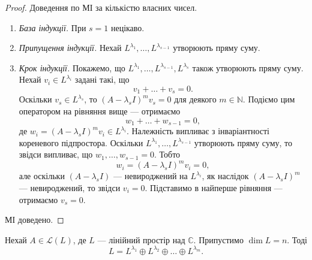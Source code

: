 \documentclass{math_library}
\begin{document}
\begin{proof}
Доведення по МІ за кількістю власних чисел.
\begin{enumerate}[nosep,wide=0pt,label={\Roman*.}]
\item \textit{База індукції.} При $s = 1$ нецікаво.

\item \textit{Припущення індукції.} Нехай $L^{\lambda_1},\dots ,L^{\lambda_{s-1}}$ утворюють пряму суму.

\item \textit{Крок індукції.} Покажемо, що $L^{\lambda_1},\dots, L^{\lambda_{s-1}},L^{\lambda_s}$ також утворюють пряму суму. Нехай $v_i \in L^{\lambda_i}$ задані такі, що 
\[
v_1+\dots+v_s = 0.
\]
Оскільки $v_s \in L^{\lambda_s}$, то $(A-\lambda_s I)^m v_s = 0$ для деякого $m \in \mathbb{N}$. Подіємо цим оператором на рівняння вище --- отримаємо
\[
w_1 + \dots + w_{s-1} = 0,
\]
де $w_i = (A-\lambda_s I)^m v_i \in L^{\lambda_i}$. Належність випливає з інваріантності кореневого підпростора. Оскільки $L^{\lambda_1},\dots,L^{\lambda_{s-1}}$ утворюють пряму суму, то звідси випливає, що $w_1,\dots,w_{s-1} = 0$. Тобто 
\[
w_i = (A-\lambda_s I)^m v_i = 0,
\]
але оскільки $(A-\lambda_s I)$ --- невироджений на $L^{\lambda_i}$, як наслідок  $(A-\lambda_s I)^m$ --- невироджений, то звідси $v_i = 0$. Підставимо в найперше рівняння --- отримаємо $v_s = 0$.
\end{enumerate}
МІ доведено.
\end{proof}

\begin{theorem}
\label{space_decomposition_into_generalized_eigenspace}
Нехай $A \in \mathcal{L}(L)$, де $L$ --- лінійний простір над $\mathbb{C}$. Припустимо $\dim L = n$. Тоді 
\[
L = L^{\lambda_1} \oplus L^{\lambda_2} \oplus \dots \oplus L^{\lambda_m}.
\]
\end{theorem}
\end{document}

